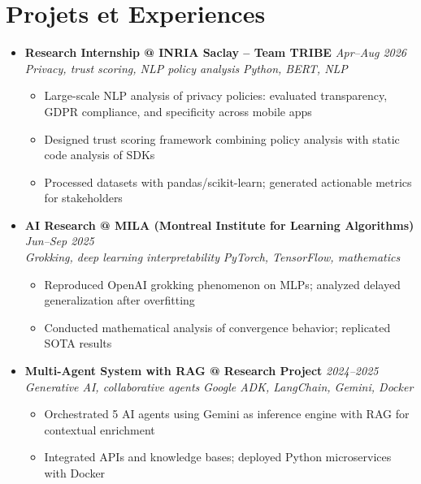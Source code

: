 \documentclass[a4paper,11pt]{article}
\begin{document}
\section{Projets et Experiences}
\begin{itemize}[leftmargin=*, label={-}]

\item \textbf{Research Internship @ INRIA Saclay -- Team TRIBE} \hfill \textit{Apr--Aug 2026} \\
\textit{Privacy, trust scoring, NLP policy analysis} \hfill \textit{Python, BERT, NLP}
\vspace{-2pt}
    \begin{itemize}[leftmargin=0.4cm, nosep, label=\tiny$\bullet$]
        \item \small{Large-scale NLP analysis of privacy policies: evaluated transparency, GDPR compliance, and specificity across mobile apps}
        \item \small{Designed trust scoring framework combining policy analysis with static code analysis of SDKs}
        \item \small{Processed datasets with pandas/scikit-learn; generated actionable metrics for stakeholders}
    \end{itemize}
\vspace{3pt}

\item \textbf{AI Research @ MILA (Montreal Institute for Learning Algorithms)} \hfill \textit{Jun--Sep 2025} \\
\textit{Grokking, deep learning interpretability} \hfill \textit{PyTorch, TensorFlow, mathematics}
\vspace{-2pt}
    \begin{itemize}[leftmargin=0.4cm, nosep, label=\tiny$\bullet$]
        \item \small{Reproduced OpenAI grokking phenomenon on MLPs; analyzed delayed generalization after overfitting}
        \item \small{Conducted mathematical analysis of convergence behavior; replicated SOTA results}
    \end{itemize}
\vspace{3pt}

\item \textbf{Multi-Agent System with RAG @ Research Project} \hfill \textit{2024--2025} \\
\textit{Generative AI, collaborative agents} \hfill \textit{Google ADK, LangChain, Gemini, Docker}
\vspace{-2pt}
    \begin{itemize}[leftmargin=0.4cm, nosep, label=\tiny$\bullet$]
        \item \small{Orchestrated 5 AI agents using Gemini as inference engine with RAG for contextual enrichment}
        \item \small{Integrated APIs and knowledge bases; deployed Python microservices with Docker}
    \end{itemize}
\vspace{3pt}


\end{itemize}
\end{document}
